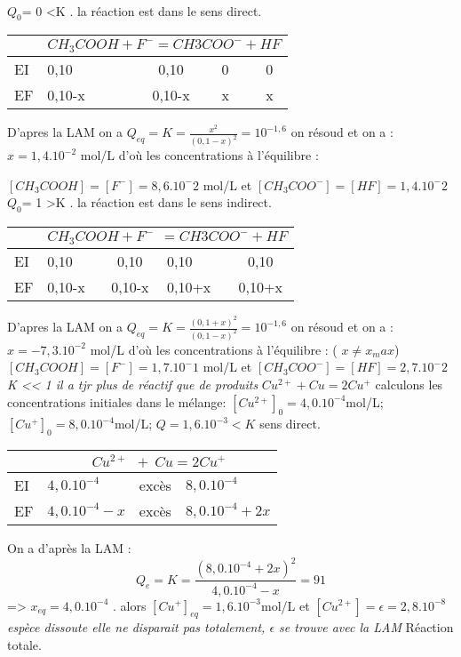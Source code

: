\begin{Answer}
\ExePart[title={Réaction Acide-base}]
~\\
\Question $Q_0$= 0 <K . la réaction est dans le sens direct. \\
\begin{center}
		\begin{tabular}{l||p{2,2cm}|c|p{}|c}
	   & \multicolumn{4}{c}{$CH_3COOH +F^- = CH3COO^- + HF $}\\
	   \hline
	EI & 0,10 	& 	0,10	& 0	& 0 \\
	EF & 0,10-x & 	0,10-x 	& x	& x \\
	\end{tabular}
\end{center}
D'apres la LAM on a $Q_{eq}=K = \frac{x^2}{(0,1-x)^2}=10^{-1,6}$ on résoud et on a :
$x= 1,4. 10^{-2}$ mol/L d'où les concentrations à l'équilibre :

$[CH_3COOH] =[F^-] = 8,6.10^-2$ mol/L et $[CH_3COO^-] =[HF] = 1,4.10^-2$
\Question
$Q_0$= 1 >K . la réaction est dans le sens indirect. \\
\begin{center}
		\begin{tabular}{l||p{}|c|p{}|c}
	   & \multicolumn{4}{l}{$CH_3COOH +F^- ~~ = CH3COO^- + HF $} \\
	   \hline
	EI & 0,10 	& 	0,10	& 0,10	& 0,10  \\
	EF & 0,10-x & 	0,10-x 	& 0,10+x& 0,10+x \\
	\end{tabular}
\end{center}

D'apres la LAM on a $Q_{eq}=K = \frac{(0,1+x)^2}{(0,1-x)^2}=10^{-1,6}$ on résoud et on a :
$x= -7,3. 10^{-2}$ mol/L d'où les concentrations à l'équilibre : ( $x \neq x_max$) $[CH_3COOH] =[F^-] = 1,7.10^-1$ mol/L et $[CH_3COO^-] =[HF] = 2,7.10^-2$
\emph{K << 1 il a tjr plus de réactif que de produits}
\ExePart[title={Réaction oxydo-réduction}]
\Question $Cu^{2+}+Cu = 2 Cu^+$
\Question calculons les concentrations initiales dans le mélange: 
$[Cu^{2+}]_0=4,0.10^{-4}$mol/L; 
$[Cu^{+}]_0=8,0.10^{-4}$mol/L;
$Q=1,6.10^{-3} < K $ sens direct.
\Question
	\begin{center}
		\begin{tabular}{l||p{}|c|p{}}
	   & \multicolumn{3}{c}{$Cu^{2+} ~~ + ~ Cu = 2Cu^+$} \\
	   \hline
	EI & $4,0.10^{-4}$ 	& 	excès	& $8,0.10^{-4}$  \\
	EF & $4,0.10^{-4}-x$ & 	excès 	& $8,0.10^{-4}+2x$\\
	\end{tabular}
	\end{center}
	On a d'après la LAM :
	\[ Q_e =K= \frac{(8,0.10^{-4}+2x)^2}{4,0.10^{-4}-x} = 91 \]
	 => $x_{eq} = 4,0.10^{-4}$ . alors $[Cu^{+}]_{eq}=1,6.10^{-3}$mol/L et $[Cu^{2+}]= \epsilon = 2,8.10^{-8} $
	 \emph{espèce dissoute elle ne disparait pas totalement, $\epsilon$ se trouve avec la LAM}
	 Réaction totale.
\end{Answer}
